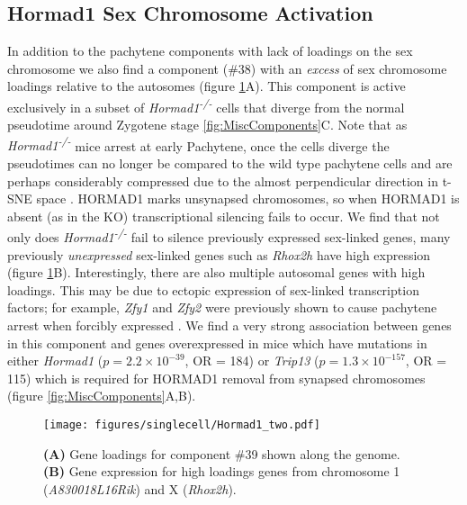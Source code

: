 \subsection{Hormad1 Sex Chromosome Activation}
In addition to the pachytene components with lack of loadings on the sex chromosome we also find a component (\#38) with an \textit{excess} of sex chromosome loadings relative to the autosomes (figure \ref{fig:Hormad1}A). This component is active exclusively in a subset of \textit{Hormad1\textsuperscript{-/-}} cells that diverge from the normal pseudotime around Zygotene stage \ref{fig:MiscComponents}C. Note that as \textit{Hormad1\textsuperscript{-/-}} mice arrest at early Pachytene, once the cells diverge the pseudotimes can no longer be compared to the wild type pachytene cells and are perhaps considerably compressed due to the almost perpendicular direction in t-SNE space \parencite{Shin2010Hormad1}. HORMAD1 marks unsynapsed chromosomes, so when HORMAD1 is absent (as in the KO) transcriptional silencing fails to occur. We find that not only does \textit{Hormad1\textsuperscript{-/-}} fail to silence previously expressed sex-linked genes, many previously \textit{unexpressed} sex-linked genes such as \textit{Rhox2h} have high expression (figure \ref{fig:Hormad1}B). Interestingly, there are also multiple autosomal genes with high loadings. This may be due to ectopic expression of sex-linked transcription factors; for example, \textit{Zfy1} and \textit{Zfy2} were previously shown to cause pachytene arrest when forcibly expressed \parencite{Royo2010Evidence}. We find a very strong association between genes in this component and genes overexpressed in mice which have mutations in either \textit{Hormad1} ($p = 2.2\times10^{-39}$, OR = 184) or \textit{Trip13} ($p = 1.3\times10^{-157}$, OR = 115) which is required for HORMAD1 removal from synapsed chromosomes  \parencite{Ortega2016Surveillance, Wojtasz2009Mouse} (figure \ref{fig:MiscComponents}A,B).

\begin{figure}[H]
	\centering
	\texttt{[image: figures/singlecell/Hormad1\_two.pdf]}
	\caption[Hormad1 KO Component]{
		\textbf{(A)} Gene loadings for component \#39 shown along the genome.
		\textbf{(B)} Gene expression for high loadings genes from chromosome 1 (\textit{A830018L16Rik}) and X (\textit{Rhox2h}).
	}
	\label{fig:Hormad1}
\end{figure}


